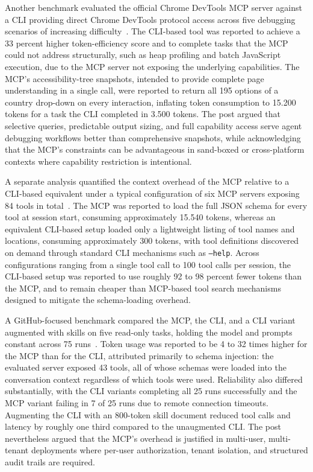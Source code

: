 \documentclass[
english,                 %
bibtex,                  %
includeExtraAbstracts, %
]{kththesis}
\numberwithin{listing}{chapter}
\begin{document}
Another benchmark evaluated the official Chrome \glspl{DevTool} \gls{MCP} server against a \gls{CLI} providing direct Chrome \glspl{DevTool} protocol access across five debugging scenarios of increasing difficulty~\cite{kumak_mcp_2025}. The \gls{CLI}-based tool was reported to achieve a 33 percent higher token-efficiency score and to complete tasks that the \gls{MCP} could not address structurally, such as heap profiling and batch JavaScript execution, due to the \gls{MCP} server not exposing the underlying capabilities. The \gls{MCP}'s accessibility-tree snapshots, intended to provide complete page understanding in a single call, were reported to return all 195 options of a country drop-down on every interaction, inflating token consumption to 15.200 tokens for a task the \gls{CLI} completed in 3.500 tokens. The post argued that selective queries, predictable output sizing, and full capability access serve agent debugging workflows better than comprehensive snapshots, while acknowledging that the \gls{MCP}'s constraints can be advantageous in sand-boxed or cross-platform contexts where capability restriction is intentional.

A separate analysis quantified the context overhead of the \gls{MCP} relative to a \gls{CLI}-based equivalent under a typical configuration of six \gls{MCP} servers exposing 84 tools in total~\cite{yilmaz_i_2026}. The \gls{MCP} was reported to load the full \gls{JSON} schema for every tool at session start, consuming approximately 15.540 tokens, whereas an equivalent \gls{CLI}-based setup loaded only a lightweight listing of tool names and locations, consuming approximately 300 tokens, with tool definitions discovered on demand through standard \gls{CLI} mechanisms such as \texttt{--help}. Across configurations ranging from a single tool call to 100 tool calls per session, the \gls{CLI}-based setup was reported to use roughly 92 to 98 percent fewer tokens than the \gls{MCP}, and to remain cheaper than \gls{MCP}-based tool search mechanisms designed to mitigate the schema-loading overhead.

A GitHub-focused benchmark compared the \gls{MCP}, the \gls{CLI}, and a \gls{CLI} variant augmented with skills on five read-only tasks, holding the model and prompts constant across 75 runs~\cite{madabhushi_mcp_2026}. Token usage was reported to be 4 to 32 times higher for the \gls{MCP} than for the \gls{CLI}, attributed primarily to schema injection: the evaluated server exposed 43 tools, all of whose schemas were loaded into the conversation context regardless of which tools were used. Reliability also differed substantially, with the \gls{CLI} variants completing all 25 runs successfully and the \gls{MCP} variant failing in 7 of 25 runs due to remote connection timeouts. Augmenting the \gls{CLI} with an 800-token skill document reduced tool calls and latency by roughly one third compared to the unaugmented \gls{CLI}. The post nevertheless argued that the \gls{MCP}'s overhead is justified in multi-user, multi-tenant deployments where per-user authorization, tenant isolation, and structured audit trails are required.
\end{document}
